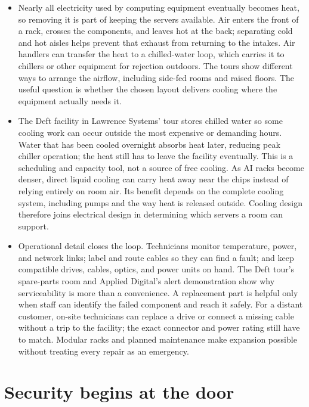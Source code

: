 \documentclass[10pt]{article}
\begin{document}
\begin{itemize}[leftmargin=1.25em, itemsep=0.3em, parsep=0pt, topsep=0pt]
    \item Nearly all electricity used by computing equipment eventually becomes heat, so removing it is part of keeping the servers available. Air enters the front of a rack, crosses the components, and leaves hot at the back; separating cold and hot aisles helps prevent that exhaust from returning to the intakes. Air handlers can transfer the heat to a chilled-water loop, which carries it to chillers or other equipment for rejection outdoors. The tours show different ways to arrange the airflow, including side-fed rooms and raised floors. The useful question is whether the chosen layout delivers cooling where the equipment actually needs it.

    \item The Deft facility in Lawrence Systems' tour stores chilled water so some cooling work can occur outside the most expensive or demanding hours. Water that has been cooled overnight absorbs heat later, reducing peak chiller operation; the heat still has to leave the facility eventually. This is a scheduling and capacity tool, not a source of free cooling. As AI racks become denser, direct liquid cooling can carry heat away near the chips instead of relying entirely on room air. Its benefit depends on the complete cooling system, including pumps and the way heat is released outside. Cooling design therefore joins electrical design in determining which servers a room can support.

    \item Operational detail closes the loop. Technicians monitor temperature, power, and network links; label and route cables so they can find a fault; and keep compatible drives, cables, optics, and power units on hand. The Deft tour's spare-parts room and Applied Digital's alert demonstration show why serviceability is more than a convenience. A replacement part is helpful only when staff can identify the failed component and reach it safely. For a distant customer, on-site technicians can replace a drive or connect a missing cable without a trip to the facility; the exact connector and power rating still have to match. Modular racks and planned maintenance make expansion possible without treating every repair as an emergency.
\end{itemize}

\newpage
\section*{Security begins at the door}
\end{document}
